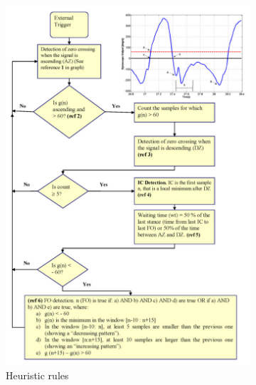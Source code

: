 \begin{figure}[!htb]
    \centering
    \begin{subfigure}[b]{0.54\textwidth}
        \includegraphics[width=\textwidth]{content/2-Background/stair_heursitic.jpg}
        \caption{Heuristic rules \cite{Formento2014}}
    \end{subfigure}
    \begin{subfigure}[b]{0.28\textwidth}

\end{subfigure}
\end{figure}
